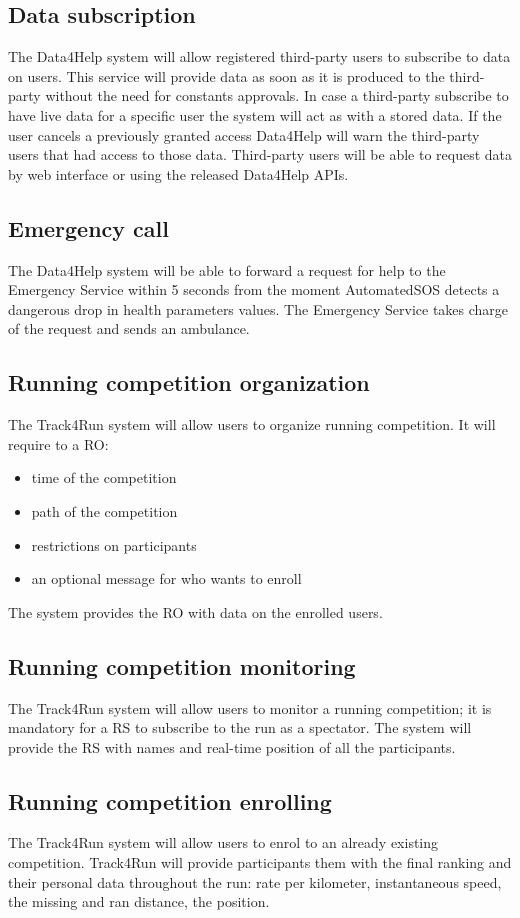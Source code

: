 \subsection{Data subscription}
The Data4Help system will allow registered third-party users to subscribe to data on users. This service will provide data as soon as it is produced to the third-party without the need for constants approvals.
In case a third-party subscribe to have live data for a specific user the system will act as with a stored data. If the user cancels a previously granted access Data4Help will warn the third-party users that had access to those data. Third-party users will be able to request data by web interface or using the released Data4Help APIs.
\\
\subsection{Emergency call}
The Data4Help system will be able to forward a request for help to the Emergency Service within 5 seconds from the moment AutomatedSOS detects a dangerous drop in health parameters values. The Emergency Service takes charge of the request and sends an ambulance. 
\\
\subsection{Running competition organization}
The Track4Run system will allow users to organize running competition. It will require to a RO: 
\begin{itemize}
\item time of the competition
\item path of the competition
\item restrictions on participants 
\item an optional message for who wants to enroll 
\end{itemize}
The system provides the RO with data on the enrolled users.
\subsection{Running competition monitoring}
The Track4Run system will allow users to monitor a running competition; it is mandatory for a RS to subscribe to the run as a spectator. The system will provide the RS with names and real-time position of all the participants.
\subsection{Running competition enrolling}
The Track4Run system will allow users to enrol to an already existing competition. Track4Run will provide participants them with the final ranking and their personal data throughout the run: rate per kilometer, instantaneous speed, the missing and ran distance, the position.

